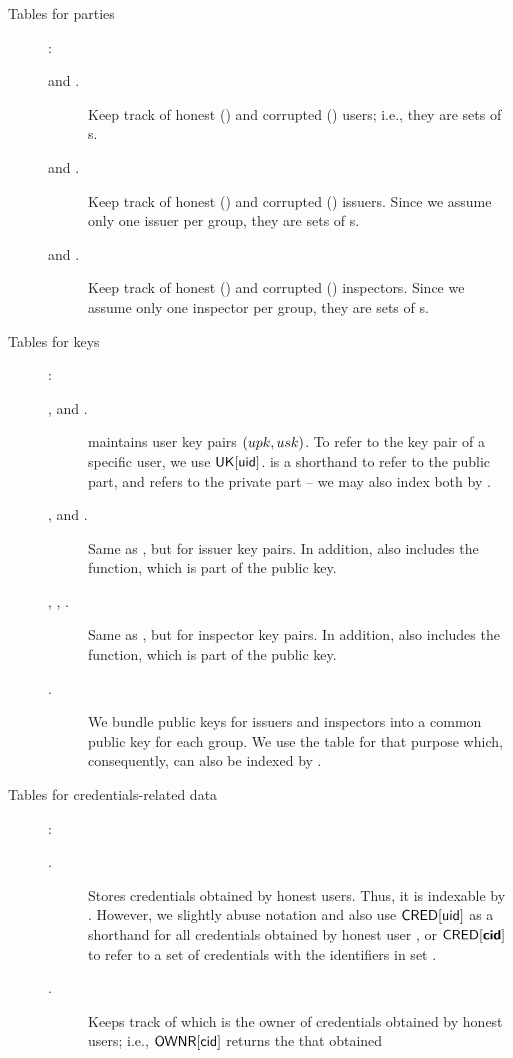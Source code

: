 \begin{description}
\item[Tables for parties]:
  \begin{description}
  \item[\HU and \CU.] Keep track of honest (\HU) and corrupted (\CU) users;
    i.e., they are sets of {\uid}s.
  \item[\HI and \CI.] Keep track of honest (\HI) and corrupted (\CI) issuers.
    Since we assume only one issuer per group, they are sets of {\gid}s.
  \item[\HO and \CO.] Keep track of honest (\HO) and corrupted (\CO) inspectors.
    Since we assume only one inspector per group, they are sets of {\gid}s.
  \end{description}
\item[Tables for keys]:
  \begin{description}
  \item[\UK, \PUBUK and \PRVUK.] \UK maintains user key pairs $(upk,usk)$.
    To refer to the key pair of a specific user, we use $\mathsf{UK}[\mathsf{uid}]$. \PUBUK
    is a shorthand to refer to the public part, and \PRVUK refers to the
    private part -- we may also index both by \uid.
  \item[\IK, \PUBIK and \PRVIK.] Same as \UK, but for issuer key pairs. In
    addition, \IK also includes the \fissue function, which is part of the
    public key.
  \item[\OK, \PUBOK, \PRVOK.] Same as \UK, but for inspector key pairs. In
    addition, \OK also includes the \finsp function, which is part of the
    public key.
  \item[\GK.] We bundle public keys for issuers and inspectors into a common
    public key for each group. We use the table \GK for that purpose which,
    consequently, can also be indexed by \gid.
  \end{description}
\item[Tables for credentials-related data]:
  \begin{description}
  \item[\CRED.] Stores credentials obtained by honest users. Thus, it is
    indexable by \cid. However, we slightly abuse notation and also use
    $\mathsf{CRED}[\mathsf{uid}]$ as a shorthand for all credentials obtained by honest user
    \uid, or $\mathsf{CRED}[\boldsymbol{\mathsf{cid}}]$ to refer to a set of credentials with the
    identifiers in set \scid.
  \item[\OWNR.] Keeps track of which \uid is the owner of credentials obtained
    by honest users; i.e., $\mathsf{OWNR}[\mathsf{cid}]$ returns the \uid that obtained

\end{description}
\end{description}
